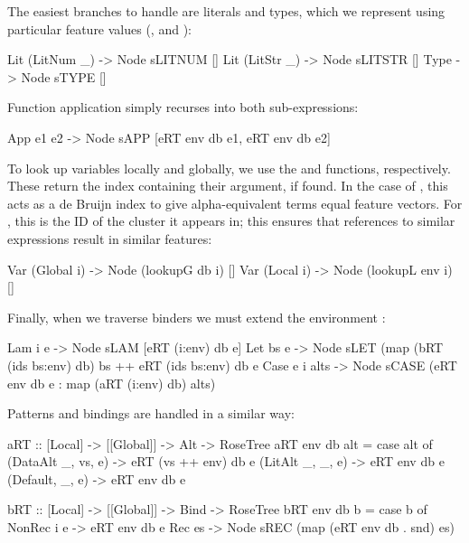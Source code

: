 The easiest branches to handle are literals and types, which we represent using particular feature values (,  and ):

\begin{haskell}
  Lit (LitNum _) -> Node sLITNUM []
  Lit (LitStr _) -> Node sLITSTR []
  Type           -> Node sTYPE   []
\end{haskell}

Function application simply recurses into both sub-expressions:

\begin{haskell}
  App e1 e2 -> Node sAPP [eRT env db e1,
                          eRT env db e2]
\end{haskell}

To look up variables locally and globally, we use the  and  functions, respectively. These return the index containing their argument, if found. In the case of , this acts as a de Bruijn index to give alpha-equivalent terms equal feature vectors. For , this is the ID of the cluster it appears in; this ensures that references to similar expressions result in similar features:

\begin{haskell}
  Var (Global i) -> Node (lookupG db  i) []
  Var (Local  i) -> Node (lookupL env i) []
\end{haskell}

Finally, when we traverse binders we must extend the environment :

\begin{haskell}
  Lam  i  e     -> Node sLAM [eRT (i:env) db e]
  Let  bs e     -> Node sLET (map (bRT (ids bs:env) db) bs ++
                                   eRT (ids bs:env) db  e
  Case e i alts -> Node sCASE (eRT    env  db  e :
                          map (aRT (i:env) db) alts)
\end{haskell}

Patterns and bindings are handled in a similar way:

\begin{haskell}
aRT :: [Local] -> [[Global]] -> Alt -> RoseTree
aRT env db alt = case alt of
  (DataAlt _, vs, e) -> eRT (vs ++ env) db e
  (LitAlt  _, _,  e) -> eRT env db e
  (Default,   _,  e) -> eRT env db e

bRT :: [Local] -> [[Global]] -> Bind -> RoseTree
bRT env db b = case b of
  NonRec i e -> eRT env db e
  Rec es     -> Node sREC (map (eRT env db . snd) es)
\end{haskell}

